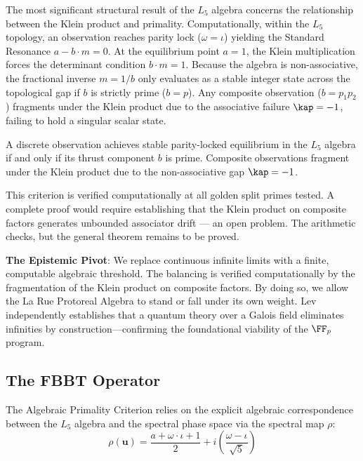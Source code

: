 The most significant structural result of the $L_5$ algebra concerns the relationship between the Klein product and primality. Computationally, within the $L_5$ topology, an observation reaches parity lock ($\omega = \iota$) yielding the Standard Resonance $a - b \cdot m = 0$. At the equilibrium point $a = 1$, the Klein multiplication forces the determinant condition $b \cdot m = 1$. Because the algebra is non-associative, the fractional inverse $m = 1/b$ only evaluates as a stable integer state across the topological gap if $b$ is strictly prime ($b = p$). Any composite observation ($b = p_1 p_2$) fragments under the Klein product due to the associative failure $\kap = -1$, failing to hold a singular scalar state.

\begin{result}\label{res:primality}
A discrete observation achieves stable parity-locked equilibrium in the $L_5$ algebra if and only if its thrust component $b$ is prime. Composite observations fragment under the Klein product due to the non-associative gap $\kap = -1$.
\end{result}

This criterion is verified computationally at all golden split primes tested. A complete proof would require establishing that the Klein product on composite factors generates unbounded associator drift --- an open problem. The arithmetic checks, but the general theorem remains to be proved.

\textbf{The Epistemic Pivot}: We replace continuous infinite limits with a finite, computable algebraic threshold. The balancing is verified computationally by the fragmentation of the Klein product on composite factors. By doing so, we allow the La Rue Protoreal Algebra to stand or fall under its own weight. Lev~\cite{lev-gfqt, lev-finite-math} independently establishes that a quantum theory over a Galois field eliminates infinities by construction---confirming the foundational viability of the $\FF_p$ program.

\subsection{The FBBT Operator}

The Algebraic Primality Criterion relies on the explicit algebraic correspondence between the $L_5$ algebra and the spectral phase space via the spectral map $\rho$:
\begin{equation}
\rho(\mathbf{u}) = \frac{a + \omega \cdot \iota + 1}{2} + i \left( \frac{\omega - \iota}{\sqrt{5}} \right)
\end{equation}

